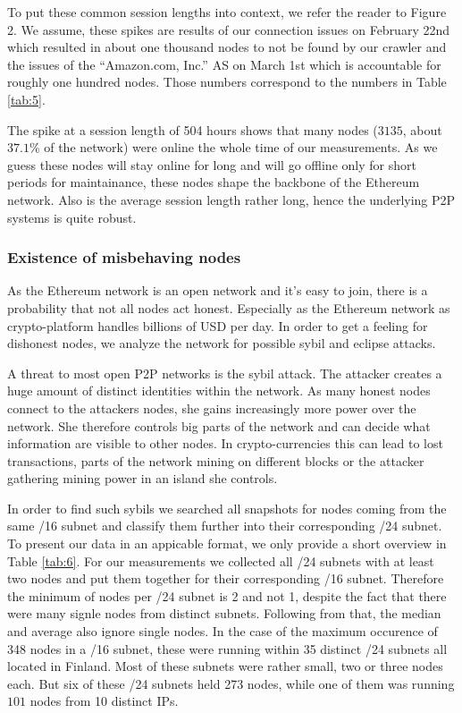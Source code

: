 \documentclass[10pt,conference,final]{IEEEtran}
\begin{document}
To put these common session lengths into context, we refer the reader to Figure 2.
We assume, these spikes are results of our connection issues on February 22nd which resulted in about one thousand nodes to not be found by our crawler and the issues of the ``Amazon.com, Inc.'' AS on March 1st which is accountable for roughly one hundred nodes.
Those numbers correspond to the numbers in Table \ref{tab:5}.

The spike at a session length of 504 hours shows that many nodes ($3135$, about $37.1$\% of the network) were online the whole time of our measurements.
As we guess these nodes will stay online for long and will go offline only for short periods for maintainance, these nodes shape the backbone of the Ethereum network.
Also is the average session length rather long, hence the underlying P2P systems is quite robust.

\vspace{1mm}

\subsubsection{Existence of misbehaving nodes}
\label{sec:RMisbehavior}
As the Ethereum network is an open network and it's easy to join, there is a probability that not all nodes act honest.
Especially as the Ethereum network as crypto-platform handles billions of USD per day.
In order to get a feeling for dishonest nodes, we analyze the network for possible sybil and eclipse attacks.

A threat to most open P2P networks is the sybil attack.
The attacker creates a huge amount of distinct identities within the network.
As many honest nodes connect to the attackers nodes, she gains increasingly more power over the network.
She therefore controls big parts of the network and can decide what information are visible to other nodes.
In crypto-currencies this can lead to lost transactions, parts of the network mining on different blocks or the attacker gathering mining power in an island she controls.

In order to find such sybils we searched all snapshots for nodes coming from the same /16 subnet and classify them further into their corresponding /24 subnet.
To present our data in an appicable format, we only provide a short overview in Table \ref{tab:6}.
For our measurements we collected all /24 subnets with at least two nodes and put them together for their corresponding /16 subnet.
Therefore the minimum of nodes per /24 subnet is 2 and not 1, despite the fact that there were many signle nodes from distinct subnets.
Following from that, the median and average also ignore single nodes.
In the case of the maximum occurence of 348 nodes in a /16 subnet, these were running within 35 distinct /24 subnets all located in Finland.
Most of these subnets were rather small, two or three nodes each.
But six of these /24 subnets held 273 nodes, while one of them was running $101$ nodes from 10 distinct IPs.
\end{document}
